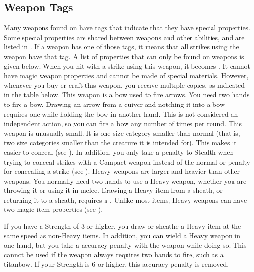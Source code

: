   \subsection{Weapon Tags}\label{Weapon Tags}
    Many weapons found on  have tags that indicate that they have special properties.
    Some special properties are shared between weapons and other abilities, and are listed in .
    If a weapon has one of those tags, it means that all strikes using the weapon have that tag.
    A list of properties that can only be found on weapons is given below.
     When you hit with a strike using this weapon, it becomes .
    It cannot have magic weapon properties and cannot be made of special materials.
    However, whenever you buy or craft this weapon, you receive multiple copies, as indicated in the table below.
     This weapon is a bow used to fire arrows.
    You need two hands to fire a bow.
    Drawing an arrow from a quiver and notching it into a bow requires one  while holding the bow in another hand.
    This is not considered an independent action, so you can fire a bow any number of times per round.
     This weapon is unusually small.
    It is one size category smaller than normal (that is, two size categories smaller than the creature it is intended for).
    This makes it easier to conceal (see ).
    In addition, you only take a  penalty to Stealth when trying to conceal strikes with a Compact weapon instead of the normal  or  penalty for concealing a strike (see ).
     Heavy weapons are larger and heavier than other weapons.
    You normally need two hands to use a Heavy weapon, whether you are throwing it or using it in melee.
    Drawing a Heavy item from a sheath, or returning it to a sheath, requires a .
    Unlike most items, Heavy weapons can have two magic item properties (see ).

    If you have a Strength of 3 or higher, you draw or sheathe a Heavy item at the same speed as non-Heavy items.
    In addition, you can wield a Heavy weapon in one hand, but you take a  accuracy penalty with the weapon while doing so.
    This cannot be used if the weapon always requires two hands to fire, such as a titanbow.
    If your Strength is 6 or higher, this accuracy penalty is removed.

